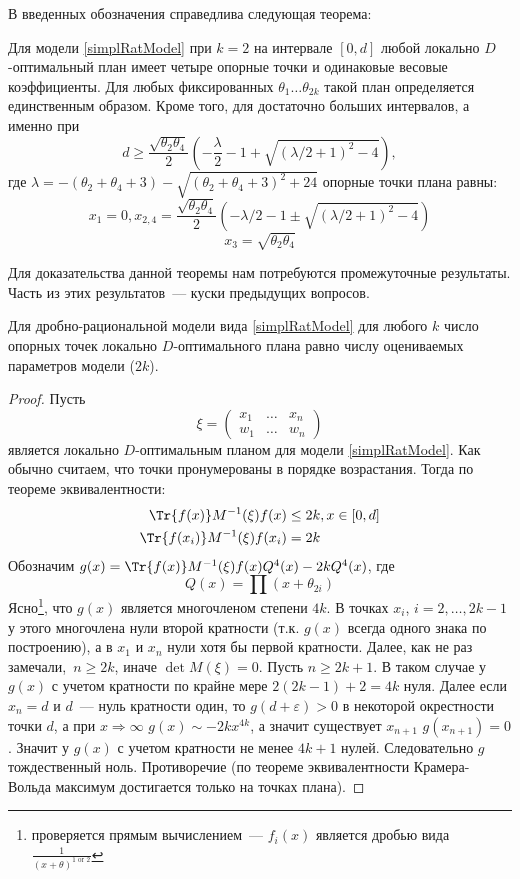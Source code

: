 В введенных обозначения справедлива следующая теорема:
\begin{thm}
Для модели \eqref{simplRatModel} при $k=2$ на интервале $[0,d]$ любой локально $D$-оптимальный план имеет четыре опорные точки и одинаковые весовые коэффициенты. Для любых фиксированных $\theta_1…\theta_{2k}$ такой план определяется единственным образом. Кроме того, для достаточно больших интервалов, а именно при 
$$ d \geq \frac{\sqrt{\theta_2\theta_4}}{2}\left(-\frac{\lambda}{2}-1+\sqrt{(\lambda/2 +1)^2 - 4}\right), $$
где $\lambda = -(\theta_2 + \theta_4 + 3) - \sqrt{(\theta_2+\theta_4+3)^2 + 24}$
опорные точки плана равны:
$$ x_1 = 0, x_{2,4} = \frac{\sqrt{\theta_2\theta_4}}{2} \left(-\lambda / 2 - 1 ± \sqrt{(\lambda /2 + 1)^2-4}\right)$$
$$x_3 = \sqrt{\theta_2\theta_4}$$
\end{thm}


Для доказательства данной теоремы нам потребуются промежуточные результаты. Часть из этих результатов — куски предыдущих вопросов. 

\begin{thm}
\label{rationalParamCountThm}
Для дробно-рациональной модели вида \eqref{simplRatModel} для любого $k$ число опорных точек локально $D$-оптимального плана равно числу оцениваемых параметров модели ($2k$).
\end{thm}
\begin{proof}
Пусть 
$$\xi = \begin{pmatrix} x_1 & … & x_n \\ w_1 & … & w_n \end{pmatrix}$$
является локально $D$-оптимальным планом для модели \eqref{simplRatModel}. Как обычно считаем, что точки пронумерованы в порядке возрастания. Тогда по теореме эквивалентности:
\begin{equation}
\begin{split}
\Tr{f(x)}M^{-1}(\xi)f(x) &\leq 2k, x\in[0,d] \\
\Tr{f(x_i)}M^{-1}(\xi)f(x_i) & = 2k
\end{split}
\end{equation}
Обозначим $g(x) = \Tr{f(x)}M^{-1}(\xi)f(x) Q^{4}(x) - 2k Q^{4}(x)$, где 
$$Q(x) = \prod (x+ \theta_{2i})$$
Ясно\footnote{проверяется прямым вычислением — $f_i(x)$ является дробью вида 
$\frac{1}{(x+\theta)^{1 \text{ or } 2}}$}, что $g(x)$ является многочленом степени $4k$. В точках $x_i$, $i=2, …, 2k-1$ у этого многочлена нули второй кратности (т.к. $g(x)$ всегда одного знака по построению), а в $x_1$ и $x_{n}$ нули хотя бы первой кратности. 
Далее, как не раз замечали, $n \geq 2k$, иначе $\det M(\xi) = 0$. 
Пусть $n \geq 2k+1$. В таком случае у $g(x)$ с учетом кратности по крайне мере $2(2k-1) +2 = 4k$ нуля. Далее
если $x_n = d$ и $d$ — нуль кратности один, то $g(d+\varepsilon) > 0$ в некоторой окрестности точки $d$, а при 
$x\Rightarrow \infty$ $g(x) \sim -2kx^{4k}$, а значит существует $x_{n+1}$ $g(x_{n+1}) = 0$. Значит у $g(x)$ с учетом кратности не менее $4k+1$ нулей. Следовательно $g$ тождественный ноль. Противоречие (по теореме эквивалентности Крамера-Вольда максимум достигается только на точках плана). 
\end{proof}

